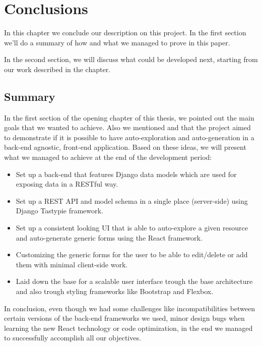 \chapter{Conclusions}
\label{chapter:conclusions}

In this chapter we conclude our description on this project. In the first section  we'll do a summary of how and what we managed to prove in this paper.

In the second section,  we will discuss what could be developed next, starting from our work described in the  chapter.

\section{Summary}
\label{sec:summary}

In the first section of the opening chapter of this thesis, we pointed out the main goals that we wanted to achieve. Also we mentioned and that the project aimed to demonstrate if it is possible to have auto-exploration and auto-generation in a back-end agnostic, front-end application. Based on these ideas, we will present what we managed to achieve at the end of the development period:

\begin{itemize}
	\item Set up a back-end that features Django data models which are used for exposing data in a RESTful way.
	\item Set up a REST API and model schema in a single place (server-side) using Django Tastypie framework.
	\item Set up a consistent looking UI that is able to auto-explore a given resource and auto-generate generic forms using the React framework.
	\item Customizing the generic forms for the user to be able to edit/delete or add them with minimal client-side work.
	\item Laid down the base for a scalable user interface trough the base architecture and also trough styling frameworks like Bootstrap and Flexbox.
\end{itemize}

In conclusion, even though we had some challenges like incompatibilities between certain versions of the back-end frameworks we used, minor design bugs when learning the new React technology or code optimization, in the end we managed to successfully accomplish all our objectives.

